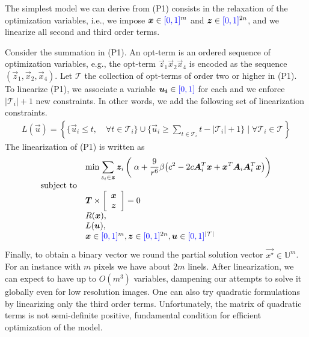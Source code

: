 	The simplest model we can derive from (P1) consists in the relaxation of the optimization variables, i.e., we impose $\bm{x} \in {\color{blue}{[0,1]}}^m$ and $\bm{z} \in {\color{blue}{[0,1]}}^{2n}$, and we linearize all second and third order terms. 
	
	Consider the summation in (P1). An opt-term is an ordered sequence of optimization variables, e.g., the opt-term $\vec{z}_1\vec{x}_2\vec{x}_4$ is encoded as the sequence $(\vec{z}_1,\vec{x}_2,\vec{x}_4)$. Let $\mathcal{T}$ the collection of opt-terms of order two or higher in (P1). To linearize (P1), we associate a variable $\bm{u_i} \in {\color{blue}{[0,1]}}$ for each  and we enforce $|\mathcal{T}_i|+1$ new constraints. In other words, we add the following set of linearization constraints.
\begin{align*}
	L(\vec{u}) = \left\{ \Big\{ \vec{u}_i \leq t, \quad \forall t \in \mathcal{T}_i \Big\} \cup \Big\{ \vec{u}_i \geq \displaystyle \sum_{t \in \mathcal{T}_i}{t} - |\mathcal{T}_i| + 1 \Big\} \; \Big| \; \forall \mathcal{T}_i \in \mathcal{T} \right\}
\end{align*}
%
%
%
The linearization of (P1) is written as
\begin{align*}
\begin{array}{ll}
& \displaystyle	\min \sum_{z_i \in \bm{z}}{ \bm{z}_i \left(\; \alpha + \frac{9}{r^6}\beta \big(c^2 - 2c\bm{A}_i^T\bm{x} + \bm{x}^T\bm{A}_i\bm{A}_i^T\bm{x}\big)\right)} \\
\text{subject to}\\
&	\bm{T} \times  \left[ \begin{array}{c}
							\bm{x} \\ 
							\bm{z} 
						   \end{array} \right] = 0 \\
&   R(\bm{x}),\\
&   L(\bm{u}),\\
&   \bm{x} \in {\color{blue}{[0,1]}}^{m}, \bm{z} \in {\color{blue}{[0,1]}}^{2n}, \bm{u} \in {\color{blue}{[0,1]}}^{|\mathcal{T}|} 
\end{array}
\end{align*}
%
	Finally, to obtain a binary vector we round the partial solution vector $\vec{x^{\star}} \in \mathbb{U}^m$. For an instance with $m$ pixels we have about $2m$ linels. After linearization, we can expect to have up to $O(m^3)$ variables, dampening our attempts to solve it globally even for low resolution images. One can also try quadratic formulations by linearizing only the third order terms. Unfortunately, the matrix of quadratic terms is not semi-definite positive, fundamental condition for efficient optimization of the model.
	


